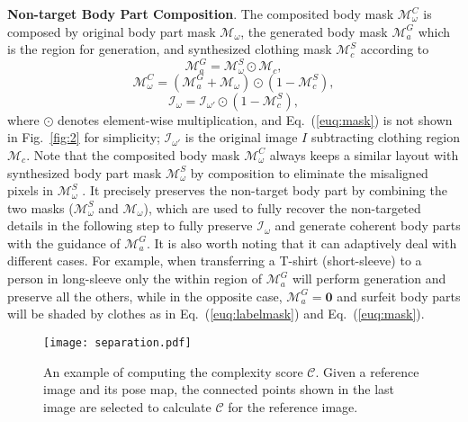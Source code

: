 \documentclass[10pt,twocolumn,letterpaper]{article}
\begin{document}
\textbf{Non-target Body Part Composition}. The composited body mask $\mathcal{M}^{C}_{\omega}$ is composed by original body part mask $\mathcal{M}_{\omega}$, the generated body mask $\mathcal{M}^{G}_{a}$ which is the region for generation, and synthesized clothing mask $\mathcal{M}^{S}_{c}$ according to 
\begin{equation}
    \mathcal{M}^{G}_{a}=\mathcal{M}^{S}_{\omega}\odot\mathcal{M}_{c},
\end{equation}
\begin{equation}
\label{euq:labelmask}
    \mathcal{M}^{C}_{\omega}=(\mathcal{M}^{G}_{a}+\mathcal{M}_{\omega})\odot(1-\mathcal{M}^{S}_{c}),
\end{equation}
\begin{equation}
\label{euq:mask}
    \mathcal{I}_{\omega}=\mathcal{I}_{\omega'}\odot(1-\mathcal{M}^{S}_{c}),
\end{equation}
where $\odot$ denotes element-wise multiplication, and Eq.~(\ref{euq:mask}) is not shown in Fig.~\ref{fig:2} for simplicity; $\mathcal{I}_{\omega'}$ is the original image $I$ subtracting clothing region $\mathcal{M}_c$. Note that the composited body mask $\mathcal{M}^{C}_{\omega}$ always keeps a similar layout with synthesized body part mask $\mathcal{M}_{\omega}^S$ by composition to eliminate the misaligned pixels in $\mathcal{M}_{\omega}^S$ .
It precisely preserves the non-target body part by combining the two masks (\ie $\mathcal{M}_{\omega}^S$ and $\mathcal{M}_{\omega}$), which are used to fully recover the non-targeted details in the following step to fully preserve $\mathcal{I}_\omega$ and generate coherent body parts with the guidance of $ \mathcal{M}^{G}_{a}$. It is also worth noting that it can adaptively deal with different cases. For example, when transferring a T-shirt (short-sleeve) to a person in long-sleeve only the within region of $\mathcal{M}^{G}_{a}$ will perform generation and preserve all the others, while in the opposite case, $\mathcal{M}^{G}_{a}=\mathbf{0}$ and surfeit body parts will be shaded by clothes as in Eq.~(\ref{euq:labelmask}) and Eq.~(\ref{euq:mask}).

\begin{figure}[htb]
\begin{center}
\vspace{-5pt}
\texttt{[image: separation.pdf]}
\vspace{-10pt}
\end{center}
   \caption{\footnotesize An example of computing the complexity score $\mathcal{C}$. Given a reference image and its pose map, the connected points shown in the last image are selected to calculate $\mathcal{C}$ for the reference image.}
\label{fig:complexity}
\vspace{-10pt}
\end{figure}
\end{document}
